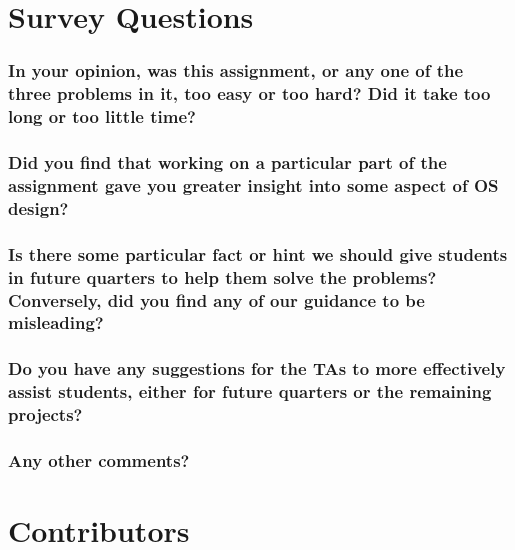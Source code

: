 \documentclass[sigconf, nonacm, balance=false, urlbreakonhyphens=true]{acmart}
\begin{document}
    \section{Survey Questions}


        \subsubsection*{In your opinion, was this assignment, or any one of the three problems in it, too easy or too hard? Did it take too long or too little time? }

        \subsubsection*{Did you find that working on a particular part of the assignment gave you greater insight into some aspect of OS design? }

        \subsubsection*{Is there some particular fact or hint we should give students in future quarters to help them solve the problems? Conversely, did you find any of our guidance to be misleading? }

        \subsubsection*{Do you have any suggestions for the TAs to more effectively assist students, either for future quarters or the remaining projects? }

        \subsubsection*{Any other comments? }
    
    \section*{Contributors}
\end{document}
